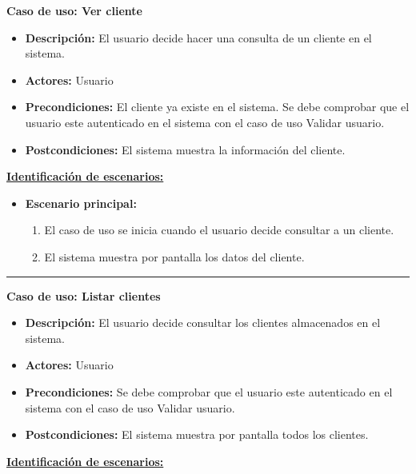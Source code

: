 \textbf{Caso de uso: Ver cliente}
\begin{itemize}\renewcommand{\labelitemi}{$\cdot$}
 \item \textbf{Descripción:} El usuario decide hacer una consulta de un cliente en el sistema.
  \item \textbf{Actores:} Usuario
  \item \textbf{Precondiciones:} El cliente ya existe en el sistema. Se debe comprobar que el usuario este autenticado en el sistema con el caso de uso Validar usuario.
  \item \textbf{Postcondiciones:} El sistema muestra la información del cliente.
\end{itemize}
\underline{\textbf{Identificación de escenarios:}}
\begin{itemize}\renewcommand{\labelitemi}{$\circ$}
 \item \textbf{Escenario principal:}
         \begin{enumerate}
          \item El caso de uso se inicia cuando el usuario decide consultar a un cliente.
	  \item El sistema muestra por pantalla los datos del cliente.
         \end{enumerate}
\end{itemize}
\smallskip
\hrule height 1pt
\smallskip
\textbf{Caso de uso: Listar clientes}
\begin{itemize}\renewcommand{\labelitemi}{$\cdot$}
 \item \textbf{Descripción:} El usuario decide consultar los clientes almacenados en el sistema.
  \item \textbf{Actores:} Usuario
  \item \textbf{Precondiciones:} Se debe comprobar que el usuario este autenticado en el sistema con el caso de uso Validar usuario.
  \item \textbf{Postcondiciones:} El sistema muestra por pantalla todos los clientes.
\end{itemize}
\underline{\textbf{Identificación de escenarios:}}
